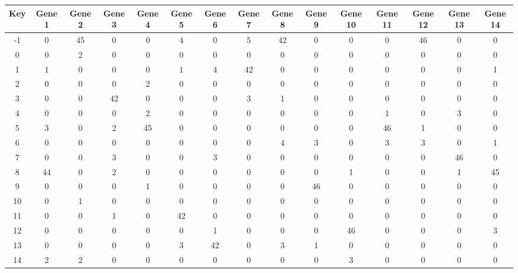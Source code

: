 \begin{tabular}{|c|c|c|c|c|c|c|c|c|c|c|c|c|c|c|}
\hline
Key & Gene 1 & Gene 2 & Gene 3 & Gene 4 & Gene 5 & Gene 6 & Gene 7 & Gene 8 & Gene 9 & Gene 10 & Gene 11 & Gene 12 & Gene 13 & Gene 14 \\
\hline
-1 & 0 & 45 & 0 & 0 & 4 & 0 & 5 & 42 & 0 & 0 & 0 & 46 & 0 & 0 \\
0 & 0 & 2 & 0 & 0 & 0 & 0 & 0 & 0 & 0 & 0 & 0 & 0 & 0 & 0 \\
1 & 1 & 0 & 0 & 0 & 1 & 4 & 42 & 0 & 0 & 0 & 0 & 0 & 0 & 1 \\
2 & 0 & 0 & 0 & 2 & 0 & 0 & 0 & 0 & 0 & 0 & 0 & 0 & 0 & 0 \\
3 & 0 & 0 & 42 & 0 & 0 & 0 & 3 & 1 & 0 & 0 & 0 & 0 & 0 & 0 \\
4 & 0 & 0 & 0 & 2 & 0 & 0 & 0 & 0 & 0 & 0 & 1 & 0 & 3 & 0 \\
5 & 3 & 0 & 2 & 45 & 0 & 0 & 0 & 0 & 0 & 0 & 46 & 1 & 0 & 0 \\
6 & 0 & 0 & 0 & 0 & 0 & 0 & 0 & 4 & 3 & 0 & 3 & 3 & 0 & 1 \\
7 & 0 & 0 & 3 & 0 & 0 & 3 & 0 & 0 & 0 & 0 & 0 & 0 & 46 & 0 \\
8 & 44 & 0 & 2 & 0 & 0 & 0 & 0 & 0 & 0 & 1 & 0 & 0 & 1 & 45 \\
9 & 0 & 0 & 0 & 1 & 0 & 0 & 0 & 0 & 46 & 0 & 0 & 0 & 0 & 0 \\
10 & 0 & 1 & 0 & 0 & 0 & 0 & 0 & 0 & 0 & 0 & 0 & 0 & 0 & 0 \\
11 & 0 & 0 & 1 & 0 & 42 & 0 & 0 & 0 & 0 & 0 & 0 & 0 & 0 & 0 \\
12 & 0 & 0 & 0 & 0 & 0 & 1 & 0 & 0 & 0 & 46 & 0 & 0 & 0 & 3 \\
13 & 0 & 0 & 0 & 0 & 3 & 42 & 0 & 3 & 1 & 0 & 0 & 0 & 0 & 0 \\
14 & 2 & 2 & 0 & 0 & 0 & 0 & 0 & 0 & 0 & 3 & 0 & 0 & 0 & 0 \\
\hline
\end{tabular}